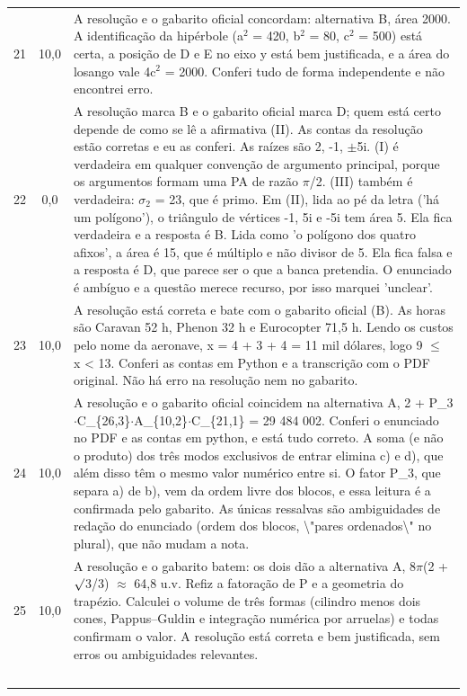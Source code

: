 \documentclass{article}%
\begin{document}
\begin{longtable}{@{}c c p{}@{}}
21 & 10,0 & A resolução e o gabarito oficial concordam: alternativa B, área 2000. A identificação da hipérbole (a$^2$ = 420, b$^2$ = 80, c$^2$ = 500) está certa, a posição de D e E no eixo y está bem justificada, e a área do losango vale 4c$^2$ = 2000. Conferi tudo de forma independente e não encontrei erro. \\
22 & 0,0 & A resolução marca B e o gabarito oficial marca D; quem está certo depende de como se lê a afirmativa (II). As contas da resolução estão corretas e eu as conferi. As raízes são 2, -1, $\pm$5i. (I) é verdadeira em qualquer convenção de argumento principal, porque os argumentos formam uma PA de razão $\pi$/2. (III) também é verdadeira: $\sigma$$_{2}$ = 23, que é primo. Em (II), lida ao pé da letra ('há um polígono'), o triângulo de vértices -1, 5i e -5i tem área 5. Ela fica verdadeira e a resposta é B. Lida como 'o polígono dos quatro afixos', a área é 15, que é múltiplo e não divisor de 5. Ela fica falsa e a resposta é D, que parece ser o que a banca pretendia. O enunciado é ambíguo e a questão merece recurso, por isso marquei 'unclear'. \\
23 & 10,0 & A resolução está correta e bate com o gabarito oficial (B). As horas são Caravan 52 h, Phenon 32 h e Eurocopter 71,5 h. Lendo os custos pelo nome da aeronave, x = 4 + 3 + 4 = 11 mil dólares, logo 9 $\leq$ x < 13. Conferi as contas em Python e a transcrição com o PDF original. Não há erro na resolução nem no gabarito. \\
24 & 10,0 & A resolução e o gabarito oficial coincidem na alternativa A, 2 + P\_3$\cdot$C\_\{26,3\}$\cdot$A\_\{10,2\}$\cdot$C\_\{21,1\} = 29 484 002. Conferi o enunciado no PDF e as contas em python, e está tudo correto. A soma (e não o produto) dos três modos exclusivos de entrar elimina c) e d), que além disso têm o mesmo valor numérico entre si. O fator P\_3, que separa a) de b), vem da ordem livre dos blocos, e essa leitura é a confirmada pelo gabarito. As únicas ressalvas são ambiguidades de redação do enunciado (ordem dos blocos, \textbackslash{}"pares ordenados\textbackslash{}" no plural), que não mudam a nota. \\
25 & 10,0 & A resolução e o gabarito batem: os dois dão a alternativa A, 8$\pi$(2 + $\surd$3/3) $\approx$ 64,8 u.v. Refiz a fatoração de P e a geometria do trapézio. Calculei o volume de três formas (cilindro menos dois cones, Pappus--Guldin e integração numérica por arruelas) e todas confirmam o valor. A resolução está correta e bem justificada, sem erros ou ambiguidades relevantes. \\
$$
\end{longtable}
\end{document}
